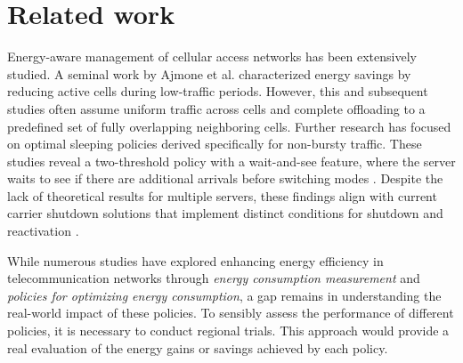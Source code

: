 \vspace{-2pt}
\section{Related work}
\label{sec:related}
\vspace{-4pt}


Energy-aware management of cellular access networks has been extensively studied. A seminal work by Ajmone et al. \cite{Ajmone2009} characterized energy savings by reducing active cells during low-traffic periods. However, this and subsequent studies often assume uniform traffic across cells and complete offloading to a predefined set of fully overlapping neighboring cells. Further research has focused on optimal sleeping policies derived specifically for non-bursty traffic. These studies reveal a two-threshold policy with a wait-and-see feature, where the server waits to see if there are additional arrivals before switching modes \cite{two_thresholds_traffic}. Despite the lack of theoretical results for multiple servers, these findings align with current carrier shutdown solutions that implement distinct conditions for shutdown and reactivation \cite{data_driven_energy23}.

While numerous studies have explored enhancing energy efficiency in telecommunication networks through \textit{energy consumption measurement} and \textit{policies for optimizing energy consumption}\cite{survey_5g_energy_efficiency, survey2011}, a gap remains in understanding the real-world impact of these policies. To sensibly assess the performance of different policies, it is necessary to conduct regional trials. This approach would provide a real evaluation of the energy gains or savings achieved by each policy.


